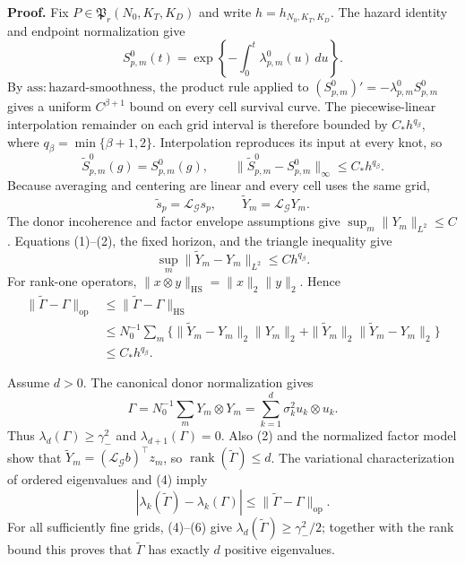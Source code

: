 \textbf{Proof.}
Fix \(P\in\mathfrak P_r(N_0,K_T,K_D)\) and write \(h=h_{N_0,K_T,K_D}\). The hazard identity and endpoint normalization give
\[
 S^0_{p,m}(t)=\exp\left\{-\int_0^t\lambda^0_{p,m}(u)\,du\right\}.
\]
By \(\mathrm{ass:hazard\mbox{-}smoothness}\), the product rule applied to \((S^0_{p,m})'=-\lambda^0_{p,m}S^0_{p,m}\) gives a uniform \(C^{\beta+1}\) bound on every cell survival curve. The piecewise-linear interpolation remainder on each grid interval is therefore bounded by \(C_*h^{q_\beta}\), where \(q_\beta=\min\{\beta+1,2\}\). Interpolation reproduces its input at every knot, so
\[
 \widetilde S^0_{p,m}(g)=S^0_{p,m}(g),
 \qquad
 \|\widetilde S^0_{p,m}-S^0_{p,m}\|_\infty\le C_*h^{q_\beta}. \tag{1}
\]
Because averaging and centering are linear and every cell uses the same grid,
\[
 \widetilde s_p=\mathcal L_{\mathcal G}s_p,
 \qquad
 \widetilde Y_m=\mathcal L_{\mathcal G}Y_m. \tag{2}
\]
The donor incoherence and factor envelope assumptions give \(\sup_m\|Y_m\|_{L^2}\le C\). Equations (1)--(2), the fixed horizon, and the triangle inequality give
\[
 \sup_m\|\widetilde Y_m-Y_m\|_{L^2}\le C h^{q_\beta}. \tag{3}
\]
For rank-one operators, \(\|x\otimes y\|_{\mathrm{HS}}=\|x\|_2\|y\|_2\). Hence
\[
 \begin{split}
 \|\widetilde\Gamma-\Gamma\|_{\mathrm{op}}
 &\le \|\widetilde\Gamma-\Gamma\|_{\mathrm{HS}}\\
 &\le N_0^{-1}\sum_m
 \{\|\widetilde Y_m-Y_m\|_2\|Y_m\|_2
   +\|\widetilde Y_m\|_2\|\widetilde Y_m-Y_m\|_2\}\\
 &\le C_*h^{q_\beta}.
 \end{split} \tag{4}
\]

Assume \(d>0\). The canonical donor normalization gives
\[
 \Gamma=N_0^{-1}\sum_mY_m\otimes Y_m
       =\sum_{k=1}^d\sigma_k^2u_k\otimes u_k. \tag{5}
\]
Thus \(\lambda_d(\Gamma)\ge\gamma_-^2\) and \(\lambda_{d+1}(\Gamma)=0\). Also (2) and the normalized factor model show that \(\widetilde Y_m=(\mathcal L_{\mathcal G}b)^{\top}z_m\), so \(\operatorname{rank}(\widetilde\Gamma)\le d\). The variational characterization of ordered eigenvalues and (4) imply
\[
 |\lambda_k(\widetilde\Gamma)-\lambda_k(\Gamma)|
 \le\|\widetilde\Gamma-\Gamma\|_{\mathrm{op}}. \tag{6}
\]
For all sufficiently fine grids, (4)--(6) give \(\lambda_d(\widetilde\Gamma)\ge\gamma_-^2/2\); together with the rank bound this proves that \(\widetilde\Gamma\) has exactly \(d\) positive eigenvalues.

